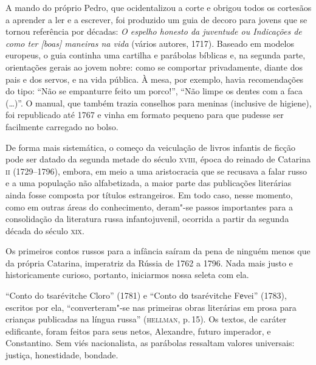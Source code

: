 A mando do próprio Pedro, que ocidentalizou a corte e obrigou todos os
cortesãos a aprender a ler e a escrever, foi produzido um guia de decoro
para jovens que se tornou referência por décadas: \emph{O espelho
honesto da juventude ou Indicações de como ter {[}boas{]} maneiras na
vida} (vários autores, 1717). Baseado em modelos europeus, o guia
continha uma cartilha e parábolas bíblicas e, na segunda parte,
orientações gerais ao jovem nobre: como se comportar privadamente,
diante dos pais e dos servos, e na vida pública. À mesa, por exemplo,
havia recomendações do tipo: ``Não se empanturre feito um porco!'',
``Não limpe os dentes com a faca (\ldots{})''. O manual, que também
trazia conselhos para meninas (inclusive de higiene), foi republicado
até 1767 e vinha em formato pequeno para que pudesse ser facilmente
carregado no bolso.

De forma mais sistemática, o começo da veiculação de livros infantis de
ficção pode ser datado da segunda metade do século \textsc{xviii}, época do
reinado de Catarina \textsc{ii} (1729--1796), embora, em meio a uma aristocracia
que se recusava a falar russo e a uma população não alfabetizada, a
maior parte das publicações literárias ainda fosse composta por títulos
estrangeiros. Em todo caso, nesse momento, como em outras áreas do
conhecimento, deram"-se passos importantes para a consolidação da
literatura russa infantojuvenil, ocorrida a partir da segunda década do
século \textsc{xix}.

Os primeiros contos russos para a infância saíram da pena de ninguém menos
que da própria Catarina, imperatriz da Rússia de 1762 a
1796. Nada mais justo e historicamente curioso, portanto, iniciarmos
nossa seleta com ela.

``Conto do tsarévitche Cloro'' (1781) e ``Conto dо
tsarévitche Fеvei'' (1783), escritos por ela, ``converteram"-se
nas primeiras obras literárias em prosa para crianças publicadas na
língua russa'' (\textsc{hellman}, p.\,15). Os textos, de caráter edificante, foram
feitos para seus netos, Alexandre, futuro imperador, e Constantino. Sem
viés nacionalista, as parábolas ressaltam valores universais: justiça,
honestidade, bondade.

